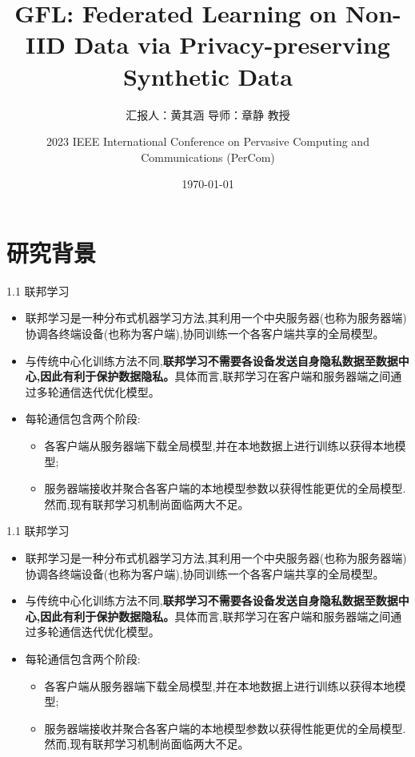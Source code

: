 \documentclass{sintefbeamer}
\title{\huge GFL: Federated Learning on Non-IID Data via Privacy-preserving Synthetic Data}
\subtitle{汇报人：黄其涵 \qquad 导师：章静 教授 \qquad }
\author{2023 IEEE International Conference on Pervasive Computing and Communications (PerCom)}
\date{\today}
\theoremstyle{definition}
\begin{document}
\maketitle


\section{研究背景}

\begin{frame}{1.1 联邦学习}
\begin{itemize}
\item 联邦学习是一种分布式机器学习方法,其利用一个中央服务器(也称为服务器端)协调各终端设备(也称为客户端),协同训练一个各客户端共享的全局模型。

\item 与传统中心化训练方法不同,\textbf{联邦学习不需要各设备发送自身隐私数据至数据中心,因此有利于保护数据隐私。}具体而言,联邦学习在客户端和服务器端之间通过多轮通信迭代优化模型。
\item 每轮通信包含两个阶段:
\begin{itemize}
\item[(1)]各客户端从服务器端下载全局模型,并在本地数据上进行训练以获得本地模型;
\item[(2)]服务器端接收并聚合各客户端的本地模型参数以获得性能更优的全局模型.然而,现有联邦学习机制尚面临两大不足。
\end{itemize}
\end{itemize}

\end{frame}

\begin{frame}{1.1 联邦学习}
\begin{itemize}
\item 联邦学习是一种分布式机器学习方法,其利用一个中央服务器(也称为服务器端)协调各终端设备(也称为客户端),协同训练一个各客户端共享的全局模型。

\item 与传统中心化训练方法不同,\textbf{联邦学习不需要各设备发送自身隐私数据至数据中心,因此有利于保护数据隐私。}具体而言,联邦学习在客户端和服务器端之间通过多轮通信迭代优化模型。
\item 每轮通信包含两个阶段:
\begin{itemize}
\item[(1)]各客户端从服务器端下载全局模型,并在本地数据上进行训练以获得本地模型;
\item[(2)]服务器端接收并聚合各客户端的本地模型参数以获得性能更优的全局模型.然而,现有联邦学习机制尚面临两大不足。
\end{itemize}
\end{itemize}

\end{frame}
\end{document}

